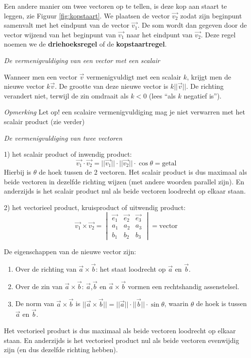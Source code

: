 Een andere manier om twee vectoren op te tellen, is deze kop aan staart te leggen, zie Figuur \ref{fig:kopstaart}. We plaatsen de vector $\vec{v_2}$ zodat zijn beginpunt samenvalt met het eindpunt van de vector $\vec{v_1}$. De som  wordt dan gegeven door de vector wijzend van het beginpunt van $\vec{v_1}$ naar het eindpunt van $\vec{v_2}$. Deze regel noemen we de \textbf{driehoeksregel} of de \textbf{kopstaartregel}.

\emph{De vermenigvuldiging van een vector met een scalair}

\begin{definitie}
	Wanneer men een vector $\vec{v}$ vermenigvuldigt met een scalair $k$, krijgt men de nieuwe vector $k\vec{v}$. De grootte van deze nieuwe vector is $k||\vec{v}||$. De richting verandert niet, terwijl de zin omdraait als $k<0$ (lees “als $k$ negatief is”).
\end{definitie}

\emph{Opmerking}
Let op! een scalaire vermenigvuldiging mag je niet verwarren met het scalair product (zie verder)

\emph{De vermenigvuldiging van twee vectoren}

\begin{definitie}
	1) het scalair product of inwendig product:
	\begin{equation*}
	\vec{v_1} \cdot \vec{v_2} = ||\vec{v_1}|| \cdot  ||\vec{v_2}|| \cdot \cos \theta = \text{getal}
	\end{equation*}
Hierbij is $\theta$ de hoek tussen de 2 vectoren. Het scalair product is dus maximaal als beide vectoren in dezelfde richting wijzen (met andere woorden parallel zijn). En anderzijds is het scalair product nul als beide vectoren loodrecht op elkaar staan.

2) het vectorieel product, kruisproduct of uitwendig product:
	\begin{equation*}
\vec{v_1} \times \vec{v_2} = \begin{vmatrix}
\vec{e_1} & \vec{e_2} & \vec{e_3} \\
a_1 & a_2 & a_3 \\
b_1 & b_2 & b_3 
\end{vmatrix} = \text{vector}
\end{equation*}
\end{definitie}
De eigenschappen van de nieuwe vector zijn:

\begin{enumerate}
	\item Over de richting van $\vec{a} \times \vec{b}$: het staat loodrecht op $\vec{a}$ en $\vec{b}$.
	\item Over de zin van $\vec{a} \times \vec{b}$: $\vec{a}$,$\vec{b}$  en $\vec{a} \times \vec{b}$ vormen een rechtshandig assenstelsel.
	\item De norm van $\vec{a} \times \vec{b}$ is $||\vec{a} \times \vec{b}||=||\vec{a}||\cdot||\vec{b}||\cdot \sin \theta$, waarin $\theta$ de hoek is tussen $\vec{a}$ en $\vec{b}$.
\end{enumerate}
Het vectorieel product is dus maximaal als beide vectoren loodrecht op elkaar staan. En anderzijds is het vectorieel product nul als beide vectoren evenwijdig zijn (en dus dezelfde richting hebben).

